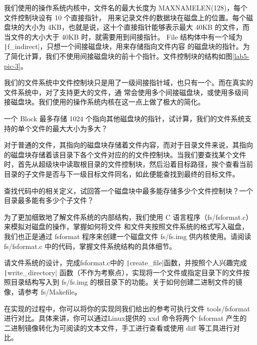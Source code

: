 我们使用的操作系统内核中，文件名的最大长度为 MAXNAMELEN(128)，每个文件控制块设有 10 个直接指针，
用来记录文件的数据块在磁盘上的位置。每个磁盘块的大小为 4KB，也就是说，这十个直接指针能够表示最大 40KB
的文件，而当文件的大小大于 40KB 时，就需要用到间接指针。
File 结构体中有一个域为 \texttt|f_indirect|，只想一个间接磁盘块，用来存储指向文件内容
的磁盘块的指针。为了简化计算，我们不使用间接磁盘块的前十个指针。文件控制块的结构如图\ref{lab5-pic-3}。

\begin{note}
我们的文件系统中文件控制块只是用了一级间接指针域，也只有一个。而在真实的文件系统中，对了支持更大的文件，通
常会使用多个间接磁盘块，或使用多级间接磁盘块。我们使用的操作系统内核在这一点上做了极大的简化。
\end{note}

\begin{thinking}\label{think-filesize}
一个 Block 最多存储 1024 个指向其他磁盘块的指针，试计算，我们的文件系统支持的单个文件的最大大小为多大？
\end{thinking}

对于普通的文件，其指向的磁盘块存储着文件内容，而对于目录文件来说，其指向的磁盘块存储着该目录下各个文件对应的的文件控制块。当我们要查找某个文件时，首先从超级块中读取根目录的文件控制块，然后沿着目标路径，挨个查看当前目录的子文件是否与下一级目标文件同名，如此便能查找到最终的目标文件。

\begin{thinking}\label{think-filenum}
查找代码中的相关定义，试回答一个磁盘块中最多能存储多少个文件控制块？一个目录最多能有多少个子文件？
\end{thinking}

为了更加细致地了解文件系统的内部结构，我们使用 C 语言程序（fs/fsformat.c）来模拟对磁盘的操作，掌握如何将文件
和文件夹按照文件系统的格式写入磁盘，我们也正是通过 fsformat 程序来创建一个磁盘文件 fs/fs.img 供内核使用。请阅读 fs/fsformat.c 中的代码，掌握文件系统结构的具体细节。

\begin{exercise}
请文件系统的设计，完成fsformat.c中的 \texttt|create_file|函数，并按照个人兴趣完成 \texttt|write_directory| 函数（不作为考察点），实现将一个文件或指定目录下的文件按照目录结构写入到 fs/fs.img 的根目录下的功能。关于如何创建二进制文件的镜像，请参考 fs/Makefile。

在实现的过程中，你可以将你的实现同我们给出的参考可执行文件 tools/fsformat 进行对比。具体来讲，你可以通过Linux提供的 xxd 命令将两个 fsformat 产生的二进制镜像转化为可阅读的文本文件，手工进行查看或使用 diff 等工具进行对比。
\end{exercise}

